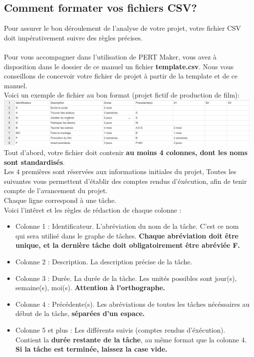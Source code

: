 \documentclass{article}
\begin{document}
\subsection{Comment formater vos fichiers CSV?}
Pour assurer le bon déroulement de l'analyse de votre projet, votre fichier CSV doit impérativement suivre des règles précises.\\ \\
Pour vous accompagner dans l'utilisation de PERT Maker, vous avez à disposition dans le dossier de ce manuel un fichier \textbf{template.csv}. Nous vous conseillons de concevoir votre fichier de projet
à partir de la template et de ce manuel. 
\\ 
Voici un exemple de fichier au bon format (projet fictif de production de film):
\\
\includegraphics[scale=0.5]{csv_exemple}
\\
Tout d'abord, votre fichier doit contenir \textbf{au moins 4 colonnes, dont les noms sont standardisés}.\\
Les 4 premières sont réservées aux informations initiales du projet,
Toutes les suivantes vous permettent d'établir des comptes rendus d'éxécution, afin
de tenir compte de l'avancement du projet. \\
Chaque ligne correspond à une tâche. \\
Voici l'intêret et les règles de rédaction de chaque colonne : \\
\begin{itemize}
    \item Colonne 1 : Identificateur. L'abréviation du nom de la tâche. C'est ce nom qui sera utilisé dans le graphe de tâches. \textbf{Chaque abréviation doit être unique, et la dernière tâche doit obligatoirement être abréviée F.}
    \item Colonne 2 : Description.  La description précise de la tâche.
    \item Colonne 3 : Durée. La durée de la tâche. Les unités possibles sont jour(s), semaine(s), moi(s). \textbf{Attention à l'orthographe.}
    \item Colonne 4 : Précédente(s). Les abréviations de toutes les tâches nécéssaires au début de la tâche, \textbf{séparées d'un espace.}
    \item Colonne 5 et plus : Les différents suivis (comptes rendus d'éxécution). Contient la \textbf{durée restante de la tâche}, au même format que la colonne 4. \textbf{Si la tâche est terminée, laissez la case vide.}
\end{itemize}
\end{document}
